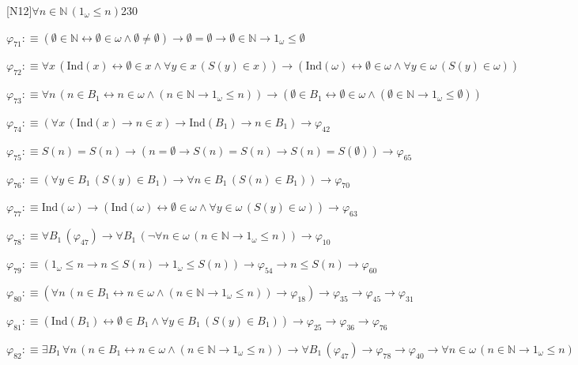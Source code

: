 \begin{fullproof}{[N12]}{$\forall n \in \mathbb{N}\,(1_{\omega} \leq n)$}{230}
\begin{abbrevlist}
\item $\varphi_{71} :\equiv (\emptyset \in \mathbb{N} \leftrightarrow \emptyset \in \omega \land \emptyset \neq \emptyset) \to \emptyset = \emptyset \to \emptyset \in \mathbb{N} \to 1_{\omega} \leq \emptyset$
\item $\varphi_{72} :\equiv \forall x\,(\mathrm{Ind}(x) \leftrightarrow \emptyset \in x \land \forall y \in x\,(S(y) \in x)) \to (\mathrm{Ind}(\omega) \leftrightarrow \emptyset \in \omega \land \forall y \in \omega\,(S(y) \in \omega))$
\item $\varphi_{73} :\equiv \forall n\,(n \in B_{1} \leftrightarrow n \in \omega \land (n \in \mathbb{N} \to 1_{\omega} \leq n)) \to (\emptyset \in B_{1} \leftrightarrow \emptyset \in \omega \land (\emptyset \in \mathbb{N} \to 1_{\omega} \leq \emptyset))$
\item $\varphi_{74} :\equiv (\forall x\,(\mathrm{Ind}(x) \to n \in x) \to \mathrm{Ind}(B_{1}) \to n \in B_{1}) \to \varphi_{42}$
\item $\varphi_{75} :\equiv S(n) = S(n) \to (n = \emptyset \to S(n) = S(n) \to S(n) = S(\emptyset)) \to \varphi_{65}$
\item $\varphi_{76} :\equiv (\forall y \in B_{1}\,(S(y) \in B_{1}) \to \forall n \in B_{1}\,(S(n) \in B_{1})) \to \varphi_{70}$
\item $\varphi_{77} :\equiv \mathrm{Ind}(\omega) \to (\mathrm{Ind}(\omega) \leftrightarrow \emptyset \in \omega \land \forall y \in \omega\,(S(y) \in \omega)) \to \varphi_{63}$
\item $\varphi_{78} :\equiv \forall B_{1}\,(\varphi_{47}) \to \forall B_{1}\,(\neg \forall n \in \omega\,(n \in \mathbb{N} \to 1_{\omega} \leq n)) \to \varphi_{10}$
\item $\varphi_{79} :\equiv (1_{\omega} \leq n \to n \leq S(n) \to 1_{\omega} \leq S(n)) \to \varphi_{54} \to n \leq S(n) \to \varphi_{60}$
\item $\varphi_{80} :\equiv (\forall n\,(n \in B_{1} \leftrightarrow n \in \omega \land (n \in \mathbb{N} \to 1_{\omega} \leq n)) \to \varphi_{18}) \to \varphi_{35} \to \varphi_{45} \to \varphi_{31}$
\item $\varphi_{81} :\equiv (\mathrm{Ind}(B_{1}) \leftrightarrow \emptyset \in B_{1} \land \forall y \in B_{1}\,(S(y) \in B_{1})) \to \varphi_{25} \to \varphi_{36} \to \varphi_{76}$
\item $\varphi_{82} :\equiv \exists B_{1}\,\forall n\,(n \in B_{1} \leftrightarrow n \in \omega \land (n \in \mathbb{N} \to 1_{\omega} \leq n)) \to \forall B_{1}\,(\varphi_{47}) \to \varphi_{78} \to \varphi_{40} \to \forall n \in \omega\,(n \in \mathbb{N} \to 1_{\omega} \leq n)$
\end{abbrevlist}
\end{fullproof}
